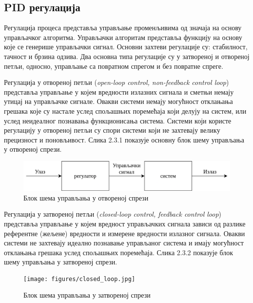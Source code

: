 \documentclass[12pt]{article}
\begin{document}
\subsection{PID регулација}
Регулација процеса представља управљање променљивима од значаја на основу управљачког алгоритма. Управљачки алгоритам представља функцију на основу које се генерише управљачки сигнал. Основни захтеви регулације су: стабилност, тачност и брзина одзива. Два основна типа регулације су у затвореној и отвореној петљи, односно, управљање са повратном спрегом и без повратне спреге. 

Регулација у отвореној петљи (\textit{open-loop control, non-feedback control loop}) представља управљање у којем вредности излазних сигнала и сметњи немају утицај на управљачке сигнале. Овакви системи немају могућност отклањања грешака које су настале услед спољашњих поремећаја који делују на систем, или услед неидеалног познавања функционисања система. Системи који користе регулацију у отвореној петљи су спори системи који не захтевају велику прецизност и поновљивост. Слика 2.3.1 показује основну блок шему управљања у отвореној спрези.

\begin{figure}[H]
    \centering
    \includegraphics[width=14cm]{figures/open_loop.drawio.png}
    \caption{Блок шема управљања у отвореној спрези}
    \label{fig:отворена_спрега}
\end{figure}

Регулација у затвореној петљи (\textit{closed-loop control, feedback control loop}) представља управљање у којем вредност управљачких сигнала зависи од разлике референтне (жељене) вредности и измерене вредности излазног сигнала. Овакви системи не захтевају идеално познавање управљаног система и имају могућност отклањања грешака услед спољашњих поремећаја. Слика 2.3.2 показује блок шему управљања у затвореној спрези.

\begin{figure}[H]
    \centering
    \texttt{[image: figures/closed\_loop.jpg]}
    \caption{Блок шема управљања у затвореној спрези}
    \label{fig:затворена_спрега}
\end{figure}
\end{document}
